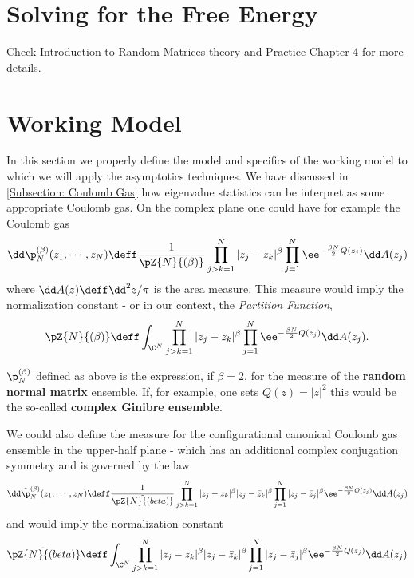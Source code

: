 \section{Solving for the Free Energy}

Check Introduction to Random Matrices theory and Practice Chapter 4 for more details. 

\section{Working Model}
\label{Section: Working Model}

In this section we properly define the model and specifics of the working model to which we will apply the asymptotics techniques. We have discussed in \autoref{Subsection: Coulomb Gas} how eigenvalue statistics can be interpret as some appropriate Coulomb gas. On the complex plane one could have for example the Coulomb gas
\begin{equation}
	\dd \p_N^{(\beta)} (z_1, \cdots, z_N) \deff \frac{1}{\pZ{N}{(\beta)}} \prod_{j > k = 1}^{N} |z_j - z_k|^\beta \prod_{j=1}^{N} \ee^{- \frac{\beta N}{2} Q(z_j)} \dd A(z_j)
	\label{Equation: Measure Normal Matrix}
\end{equation}
where $\dd A(z) \deff \dd^2 z / \pi$ is the area measure. This measure would imply the normalization constant - or in our context, the \textit{Partition Function},
\begin{equation}
	\pZ{N}{(\beta)} \deff \int_{\C^N} \prod_{j > k = 1}^{N} |z_j - z_k|^\beta \prod_{j=1}^{N} \ee^{- \frac{\beta N}{2} Q(z_j)} \dd A(z_j).
\end{equation}

\begin{definicao}
	$\p_N^{(\beta)}$ defined as above is the expression, if $\beta = 2$, for the measure of the \textbf{random normal matrix} ensemble. If, for example, one sets $Q(z) = |z|^2$ this would be the so-called \textbf{complex Ginibre ensemble}.
\end{definicao}

We could also define the measure for the configurational canonical Coulomb gas ensemble in the upper-half plane  - which has an additional complex conjugation symmetry and is governed by the law 
\begin{equation}
	\dd \tilde{\p}_N^{(\beta)} (z_1, \cdots, z_N) \deff \frac{1}{\tilde{\pZ{N}{(beta)}}} \prod_{j > k = 1}^{N} |z_j - z_k|^\beta |z_j - \bar{z}_k|^\beta \prod_{j=1}^{N} |z_j - \bar{z}_j|^\beta  \ee^{- \frac{\beta N}{2} Q(z_j)} \dd A(z_j)
\end{equation}
and would imply the normalization constant
\begin{equation}
	\tilde{\pZ{N}{(beta)}} \deff \int_{\C^N} \prod_{j > k = 1}^{N} |z_j - z_k|^\beta |z_j - \bar{z}_k|^\beta \prod_{j=1}^{N} |z_j - \bar{z}_j|^\beta  \ee^{- \frac{\beta N}{2} Q(z_j)} \dd A(z_j)
\end{equation}

